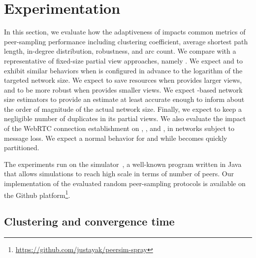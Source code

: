 \newcommand\SCALE{0.8}

\section{Experimentation}
\label{sec:experimentation}


In this section, we evaluate how the adaptiveness of \SPRAY impacts common
metrics of peer-sampling performance including clustering coefficient, average
shortest path length, in-degree distribution, robustness, and arc count. We
compare \SPRAY with a representative of fixed-size partial view approaches,
namely \CYCLON. We expect \SPRAY and \CYCLON to exhibit similar behaviors when
\CYCLON is configured in advance to the logarithm of the targeted network
size. We expect \SPRAY to save resources when \CYCLON provides larger views, and
to be more robust when \CYCLON provides smaller views. We expect \SPRAY-based
network size estimators to provide an estimate at least accurate enough to
inform about the order of magnitude of the actual network size.  Finally, we
expect \SPRAY to keep a negligible number of duplicates in its partial views. We
also evaluate the impact of the WebRTC connection establishment on \CYCLON,
\SCAMP, and \SPRAY, in networks subject to message loss.  We expect a normal
behavior for \CYCLON and \SPRAY while \SCAMP becomes quickly partitioned.

The experiments run on the \PEERSIM simulator~\cite{montresor2009peersim}, a
well-known program written in Java that allows simulations to reach high scale
in terms of number of peers. Our implementation of the evaluated random
peer-sampling protocols is available on the Github
platform\footnote{\url{https://github.com/justayak/peersim-spray}}.


\subsection{Clustering and convergence time}

